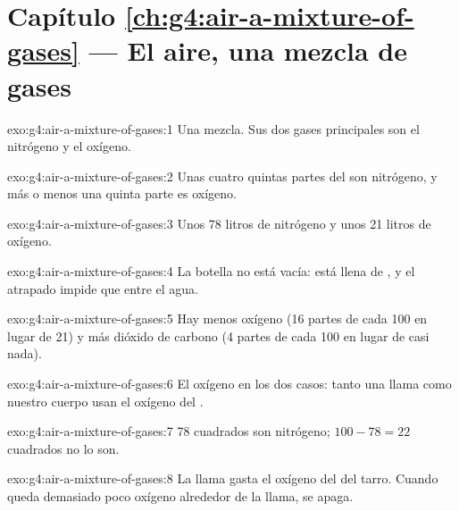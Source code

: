 \section*{Capítulo \ref{ch:g4:air-a-mixture-of-gases} --- El aire, una mezcla de gases}

\begin{solution}{exo:g4:air-a-mixture-of-gases:1}
Una mezcla. Sus dos gases principales son el nitrógeno y el oxígeno.
\end{solution}

\begin{solution}{exo:g4:air-a-mixture-of-gases:2}
Unas cuatro quintas partes del  son nitrógeno, y más o menos una
quinta parte es oxígeno.
\end{solution}

\begin{solution}{exo:g4:air-a-mixture-of-gases:3}
Unos 78 litros de nitrógeno y unos 21 litros de oxígeno.
\end{solution}

\begin{solution}{exo:g4:air-a-mixture-of-gases:4}
La botella no está vacía: está llena de , y el  atrapado impide
que entre el agua.
\end{solution}

\begin{solution}{exo:g4:air-a-mixture-of-gases:5}
Hay menos oxígeno (16 partes de cada 100 en lugar de 21) y más dióxido
de carbono (4 partes de cada 100 en lugar de casi nada).
\end{solution}

\begin{solution}{exo:g4:air-a-mixture-of-gases:6}
El oxígeno en los dos casos: tanto una llama como nuestro cuerpo usan
el oxígeno del .
\end{solution}

\begin{solution}{exo:g4:air-a-mixture-of-gases:7}
78 cuadrados son nitrógeno; $100 - 78 = 22$ cuadrados no lo son.
\end{solution}

\begin{solution}{exo:g4:air-a-mixture-of-gases:8}
La llama gasta el oxígeno del  del tarro. Cuando queda demasiado
poco oxígeno alrededor de la llama, se apaga.
\end{solution}

